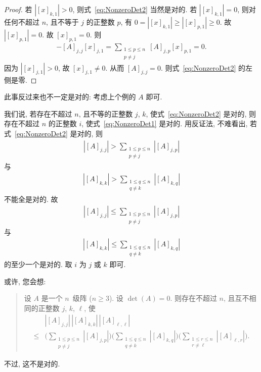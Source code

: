 \begin{proof}
    若 \(|[x]_{k,1}| > 0\),
    则式~\eqref{eq:NonzeroDet2} 当然是对的.
    若 \(|[x]_{k,1}| = 0\),
    则对任何不超过 \(n\), 且不等于 \(j\) 的正整数 \(p\),
    有 \(0 = |[x]_{k,1}| \geq |[x]_{p,1}| \geq 0\).
    故 \(|[x]_{p,1}| = 0\).
    故 \([x]_{p,1} = 0\).
    则
    \begin{align*}
        -[A]_{j,j} [x]_{j,1}
        = \sum_{\substack{1 \leq p \leq n \\ p \neq j}}
        {[A]_{j,p} [x]_{p,1}} = 0.
    \end{align*}
    因为 \(|[x]_{j,1}| > 0\),
    故 \([x]_{j,1} \neq 0\).
    从而 \([A]_{j,j} = 0\).
    则式~\eqref{eq:NonzeroDet2} 的左侧是零.
\end{proof}

此事反过来也不一定是对的:
考虑上个例的 \(A\) 即可.

我们说, 若存在不超过 \(n\), 且不等的正整数 \(j\), \(k\),
使式~\eqref{eq:NonzeroDet2} 是对的,
则存在不超过 \(n\) 的正整数 \(i\),
使式~\eqref{eq:NonzeroDet1} 是对的.
用反证法, 不难看出, 若式~\eqref{eq:NonzeroDet2} 是对的,
则
\begin{align*}
    |[A]_{j,j}| >
    \sum_{\substack{1 \leq p \leq n \\
        p \neq j}} {|[A]_{j,p}|}
\end{align*}
与
\begin{align*}
    |[A]_{k,k}| >
    \sum_{\substack{1 \leq q \leq n \\
        q \neq k}} {|[A]_{k,q}|}
\end{align*}
不能全是对的.
故
\begin{align*}
    |[A]_{j,j}| \leq
    \sum_{\substack{1 \leq p \leq n \\
        p \neq j}} {|[A]_{j,p}|}
\end{align*}
与
\begin{align*}
    |[A]_{k,k}| \leq
    \sum_{\substack{1 \leq q \leq n \\
        q \neq k}} {|[A]_{k,q}|}
\end{align*}
的至少一个是对的.
取 \(i\) 为 \(j\) 或 \(k\) 即可.

\vspace{2ex}

或许, 您会想:
\begin{quotation}
    设 \(A\) 是一个 \(n\)~级阵 (\(n \geq 3\)).
    设 \(\det {(A)} = 0\).
    则存在不超过 \(n\),
    且互不相同的正整数 \(j\), \(k\), \(\ell\), 使
    \begin{align*}
                &
        |[A]_{j,j}|\,|[A]_{k,k}|\, |[A]_{\ell,\ell}|
        \\
        \leq {} &
        \Bigg(
        \sum_{\substack{1 \leq p \leq n \\
                p \neq j}} {|[A]_{j,p}|}
        \Bigg)
        \Bigg(
        \sum_{\substack{1 \leq q \leq n \\
                q \neq k}} {|[A]_{k,q}|}
        \Bigg)
        \Bigg(
        \sum_{\substack{1 \leq r \leq n \\
                r \neq \ell}} {|[A]_{\ell,r}|}
        \Bigg).
    \end{align*}
\end{quotation}
不过, 这不是对的.

